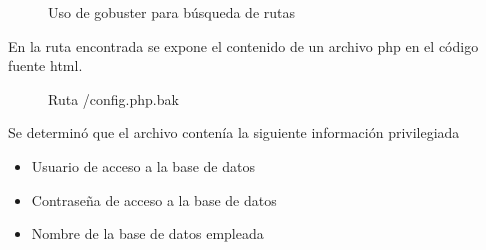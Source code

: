 \documentclass[a4paper]{article}
\begin{document}
\begin{figure}[H]
  \begin{center}
    \setlength{\fboxrule}{0.8pt}
    \caption{Uso de gobuster para búsqueda de rutas}
    \label{fig: Identifiedsubdomains}
  \end{center}
\end{figure}

\vspace{0.4cm}

En la ruta encontrada se expone el contenido de un archivo php en el código fuente html.
\begin{figure}[H]
  \begin{center}
    \setlength{\fboxrule}{0.8pt}
    \caption{Ruta /config.php.bak}
    \label{fig: Identifiedsubdomains}
  \end{center}
\end{figure}
\vspace{0.4cm}

Se determinó que el archivo contenía la siguiente información privilegiada

\begin{itemize}
  \item Usuario de acceso a la base de datos
  \item Contraseña de acceso a la base de datos
  \item Nombre de la base de datos empleada
\end{itemize}
\end{document}
